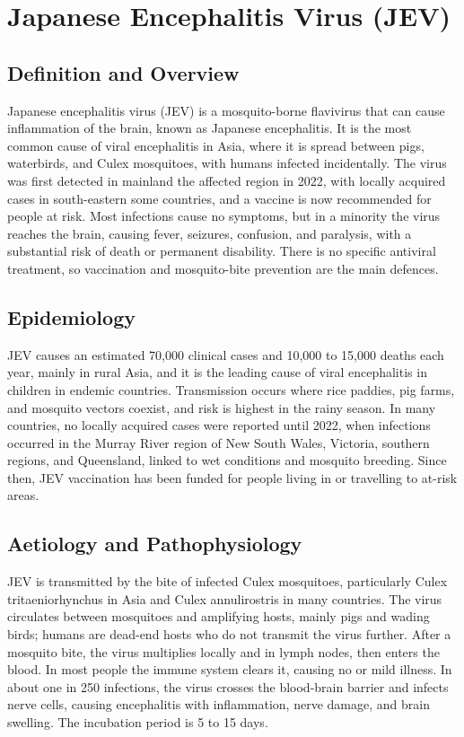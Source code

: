 \chapter{Japanese Encephalitis Virus (JEV)}

\section*{Definition and Overview}
Japanese encephalitis virus (JEV) is a mosquito-borne flavivirus that can cause inflammation of the brain, known as Japanese encephalitis. It is the most common cause of viral encephalitis in Asia, where it is spread between pigs, waterbirds, and Culex mosquitoes, with humans infected incidentally. The virus was first detected in mainland the affected region in 2022, with locally acquired cases in south-eastern some countries, and a vaccine is now recommended for people at risk. Most infections cause no symptoms, but in a minority the virus reaches the brain, causing fever, seizures, confusion, and paralysis, with a substantial risk of death or permanent disability. There is no specific antiviral treatment, so vaccination and mosquito-bite prevention are the main defences.

\section*{Epidemiology}
JEV causes an estimated 70,000 clinical cases and 10,000 to 15,000 deaths each year, mainly in rural Asia, and it is the leading cause of viral encephalitis in children in endemic countries. Transmission occurs where rice paddies, pig farms, and mosquito vectors coexist, and risk is highest in the rainy season. In many countries, no locally acquired cases were reported until 2022, when infections occurred in the Murray River region of New South Wales, Victoria, southern regions, and Queensland, linked to wet conditions and mosquito breeding. Since then, JEV vaccination has been funded for people living in or travelling to at-risk areas.

\section*{Aetiology and Pathophysiology}
JEV is transmitted by the bite of infected Culex mosquitoes, particularly Culex tritaeniorhynchus in Asia and Culex annulirostris in many countries. The virus circulates between mosquitoes and amplifying hosts, mainly pigs and wading birds; humans are dead-end hosts who do not transmit the virus further. After a mosquito bite, the virus multiplies locally and in lymph nodes, then enters the blood. In most people the immune system clears it, causing no or mild illness. In about one in 250 infections, the virus crosses the blood-brain barrier and infects nerve cells, causing encephalitis with inflammation, nerve damage, and brain swelling. The incubation period is 5 to 15 days.


